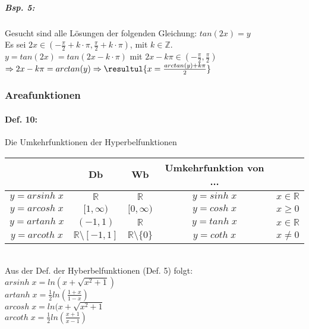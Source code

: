 \subparagraph{Bsp. 5:}\parskp
Gesucht sind alle Lösungen der folgenden Gleichung: $tan(2x)=y$\\
Es sei $2x \in \left( -\frac{\pi}{2}+k \cdot \pi, \frac{\pi}{2} + k \cdot \pi\right)$, mit $k \in \mathbb{Z}$.\\
$y=tan(2x)=tan(2x-k\cdot \pi)$ mit $2x-k\pi \in \left(-\frac{\pi}{2}, \frac{\pi}{2}\right)$\\
$\Rightarrow 2x - k \pi = arctan(y) \Rightarrow \resultul{x = \frac{arctan(y)+k\pi}{2}}$

\subsubsection{Areafunktionen}

\paragraph{Def. 10:} \parskp
Die Umkehrfunktionen der Hyperbelfunktionen\\
\begin{tabular}{c | c | c | c l}
 & Db & Wb & Umkehrfunktion von ...\\
\hline
$y=arsinh\; x$ & $\mathbb{R}$ & $\mathbb{R}$ & $y=sinh\;x$ & $ x \in \mathbb{R}$\\
$y=arcosh\; x $ & $[1,\infty)$ & $[0,\infty)$ & $y=cosh\; x$ & $x\geq 0$\\
$y=artanh\; x$ & $(-1,1)$ & $\mathbb{R}$ & $y=tanh \; x $ & $x \in \mathbb{R}$\\
$y=arcoth\; x $ & $\mathbb{R}\setminus[-1,1]$ & $\mathbb{R}\setminus\{0\}$ & $y=coth\; x$ & $x \not = 0$\\
\end{tabular}\\
Aus der Def. der Hyberbelfunktionen (Def. 5) folgt:\\
$arsinh\; x = ln (x+\sqrt{x^2+1})$\\
$artanh\; x=\frac{1}{2}ln\left(\frac{1+x}{1-x}\right)$\\
$arcosh\; x = ln (x+\sqrt{x^2+1}$\\
$arcoth\; x = \frac{1}{2}ln\left(\frac{x+1}{x-1}\right)$